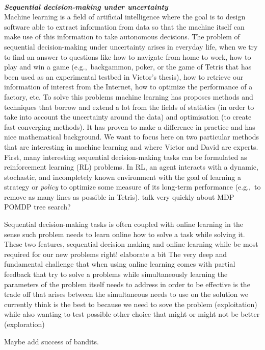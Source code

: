 \noindent \textbf{\textit{\\Sequential decision-making under uncertainty}}\\
Machine learning is a field of artificial intelligence where the goal is to design software able to extract information from data so that the machine itself can make use of this information to take  autonomous decisions.
The problem of sequential decision-making under uncertainty arises in everyday life, when we try to find an answer to questions like how to navigate from home to work, how to play and win a game (e.g.,~backgammon, poker, or the game of Tetris that has been used as an experimental testbed in Victor's thesis), how to retrieve our information of interest from the Internet, how to optimize the performance of a factory, etc. To solve this problems machine learning has proposes methods and techniques that borrow and extend a lot from the fields of statistics (in order to take into account the uncertainty around the data) and optimisation (to create fast converging methods). It has proven to make a difference in practice and has nice mathematical background. We want to focus here on two particular methods that are interesting in machine learning and where Victor and David are experts.
First, many interesting sequential decision-making tasks can be formulated as reinforcement learning (RL) problems. In RL, an agent interacts with a dynamic, stochastic, and incompletely known environment with the goal of learning a strategy or \textit{policy} to optimize some measure of its long-term performance (e.g.,~to remove as many lines as possible in Tetris).
talk very quickly about MDP POMDP tree search?

Sequential decision-making tasks is often coupled with online learning in the sense such problem needs to learn online how to solve a task while solving it. These two features, sequential decision making and online learning while be most required for our new problems right! elaborate a bit
The very deep and fundamental challenge that when using online learning comes with partial feedback  that try to solve a problems while simultaneously learning the parameters of the problem itself needs to address in order to be effective is the trade off that arises between the simultaneous needs to use on the solution we currently think is the best to because we need to sove the problem  (exploitation)  while also wanting to test possible other choice that might or might not be better (exploration)

Maybe add success of bandits.

